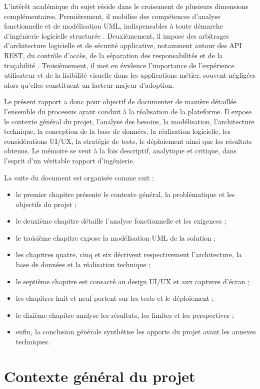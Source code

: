 L'intérêt académique du sujet réside dans le croisement de plusieurs dimensions complémentaires. Premièrement, il mobilise des compétences d'analyse fonctionnelle et de modélisation UML, indispensables à toute démarche d'ingénierie logicielle structurée \cite{booch2005}. Deuxièmement, il impose des arbitrages d'architecture logicielle et de sécurité applicative, notamment autour des API REST, du contrôle d'accès, de la séparation des responsabilités et de la traçabilité \cite{fielding2000,owasp2021}. Troisièmement, il met en évidence l'importance de l'expérience utilisateur et de la lisibilité visuelle dans les applications métier, souvent négligées alors qu'elles constituent un facteur majeur d'adoption.

Le présent rapport a donc pour objectif de documenter de manière détaillée l'ensemble du processus ayant conduit à la réalisation de la plateforme. Il expose le contexte général du projet, l'analyse des besoins, la modélisation, l'architecture technique, la conception de la base de données, la réalisation logicielle, les considérations UI/UX, la stratégie de tests, le déploiement ainsi que les résultats obtenus. Le mémoire se veut à la fois descriptif, analytique et critique, dans l'esprit d'un véritable rapport d'ingénierie.

La suite du document est organisée comme suit :
\begin{itemize}
  \item le premier chapitre présente le contexte général, la problématique et les objectifs du projet ;
  \item le deuxième chapitre détaille l'analyse fonctionnelle et les exigences ;
  \item le troisième chapitre expose la modélisation UML de la solution ;
  \item les chapitres quatre, cinq et six décrivent respectivement l'architecture, la base de données et la réalisation technique ;
  \item le septième chapitre est consacré au design UI/UX et aux captures d'écran ;
  \item les chapitres huit et neuf portent sur les tests et le déploiement ;
  \item le dixième chapitre analyse les résultats, les limites et les perspectives ;
  \item enfin, la conclusion générale synthétise les apports du projet avant les annexes techniques.
\end{itemize}

\chapter{Contexte général du projet}
\label{chap:contexte}

